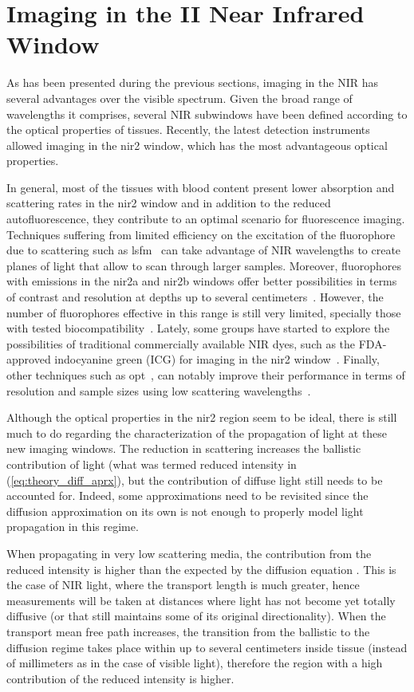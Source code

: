 \section{Imaging in the II Near Infrared Window}
\label{sec:imaging}
As has been presented during the previous sections, imaging in the NIR has several advantages over the visible spectrum. Given the broad range of wavelengths it comprises, several NIR subwindows have been defined according to the optical properties of tissues. Recently, the latest detection instruments allowed imaging in the \gls{nir2} window, which has the most advantageous optical properties.

In general, most of the tissues with blood content present lower absorption and scattering rates in the \gls{nir2} window and in addition to the reduced autofluorescence, they contribute to an optimal scenario for fluorescence imaging. Techniques suffering from limited efficiency on the excitation of the fluorophore due to scattering such as \gls{lsfm}~\cite{Huisken2004, Olarte2018} can take advantage of NIR wavelengths to create planes of light that allow to scan through larger samples. Moreover, fluorophores with emissions in the \gls{nir2}a and \gls{nir2}b windows offer better possibilities in terms of contrast and resolution at depths up to several centimeters~\cite{Hong2014,Diao2015}. However, the number of fluorophores effective in this range is still very limited, specially those with tested biocompatibility~\cite{Hong2017}. Lately, some groups have started to explore the possibilities of traditional commercially available NIR dyes, such as the FDA-approved indocyanine green (ICG) for imaging in the \gls{nir2} window~\cite{Carr2018a}. Finally, other techniques such as \gls{opt}~\cite{Sharpe2002}, can notably improve their performance in terms of resolution and sample sizes using low scattering wavelengths~\cite{Fieramonti2012,Ripoll2009,Arranz2014}.

Although the optical properties in the \gls{nir2} region seem to be ideal, there is still much to do regarding the characterization of the propagation of light at these new imaging windows. The reduction in scattering increases the ballistic contribution of light (what was termed reduced intensity in (\ref{eq:theory_diff_aprx}), but the contribution of diffuse light still needs to be accounted for. Indeed, some approximations need to be revisited since the diffusion approximation on its own is not enough to properly model light propagation in this regime.

When propagating in very low scattering media, the contribution from the reduced intensity is higher than the expected by the diffusion equation \cite{Yoo1990}. This is the case of NIR light, where the transport length is much greater, hence measurements will be taken at distances where light has not become yet totally diffusive (or that still maintains some of its original directionality). When the transport mean free path increases, the transition from the ballistic to the diffusion regime takes place within up to several centimeters inside tissue (instead of millimeters as in the case of visible light), therefore the region with a high contribution of the reduced intensity is higher.

